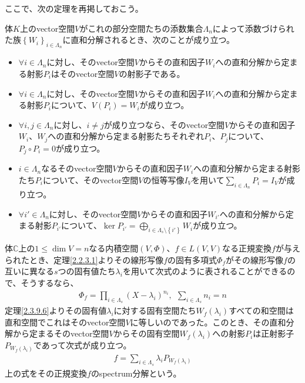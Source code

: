 \documentclass[dvipdfmx]{jsarticle}
\begin{document}
ここで、次の定理を再掲しておこう。
\begin{thm*}
体$K$上のvector空間$V$がこれの部分空間たちの添数集合$\varLambda_{n}$によって添数づけられた族$\left\{ W_{i} \right\}_{i \in \varLambda_{n}}$に直和分解されるとき、次のことが成り立つ。
\begin{itemize}
\item
  $\forall i \in \varLambda_{n}$に対し、そのvector空間$V$からその直和因子$W_{i}$への直和分解から定まる射影$P_{i}$はそのvector空間$V$の射影子である。
\item
  $\forall i \in \varLambda_{n}$に対し、そのvector空間$V$からその直和因子$W_{i}$への直和分解から定まる射影$P_{i}$について、$V\left( P_{i} \right) = W_{i}$が成り立つ。
\item
  $\forall i,j \in \varLambda_{n}$に対し、$i \neq j$が成り立つなら、そのvector空間$V$からその直和因子$W_{i}$、$W_{j}$への直和分解から定まる射影たちそれぞれ$P_{i}$、$P_{j}$について、$P_{j} \circ P_{i} = 0$が成り立つ。
\item
  $i \in \varLambda_{n}$なるそのvector空間$V$からその直和因子$W_{i}$への直和分解から定まる射影たち$P_{i}$について、そのvector空間$V$の恒等写像$I_{V}$を用いて$\sum_{i \in \varLambda_{n}} P_{i} = I_{V}$が成り立つ。
\item
  $\forall i' \in \varLambda_{n}$に対し、そのvector空間$V$からその直和因子$W_{i'}$への直和分解から定まる射影$P_{i'}$について、$\ker P_{i'} = \bigoplus_{i \in \varLambda_s \setminus \left\{ i' \right\}} W_{i}$が成り立つ。
\end{itemize}
\end{thm*}
\begin{thm}[spectrum分解]\label{2.3.9.8}
体$\mathbb{C}$上の$1 \leq \dim V = n$なる内積空間$(V,\varPhi)$、$f \in L(V,V)$なる正規変換$f$が与えられたとき、定理\ref{2.2.3.1}よりその線形写像$f$の固有多項式$\varPhi_{f}$がその線形写像$f$の互いに異なる$s$つの固有値たち$\lambda_{i}$を用いて次式のように表されることができるので、そうするなら、
\begin{align*}
\varPhi_{f} = \prod_{i \in \varLambda_{s}} \left( X - \lambda_{i} \right)^{n_{i}},\ \ \sum_{i \in \varLambda_{s}} n_{i} = n
\end{align*}
定理\ref{2.3.9.6}よりその固有値$\lambda_{i}$に対する固有空間たち$W_{f}\left( \lambda_{i} \right)$すべての和空間は直和空間でこれはそのvector空間$V$に等しいのであった。このとき、その直和分解から定まるそのvector空間$V$からその固有空間$W_{f}\left( \lambda_{i} \right)$への射影$P_{i}$は正射影子$P_{W_{f}\left( \lambda_{i} \right)}$であって次式が成り立つ。
\begin{align*}
f = \sum_{i \in \varLambda_{s}} {\lambda_{i}P_{W_{f}\left( \lambda_{i} \right)}}
\end{align*}
上の式をその正規変換$f$のspectrum分解という。
\end{thm}
\end{document}
